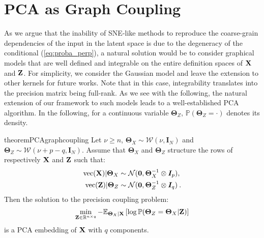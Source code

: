 \section{PCA as Graph Coupling}

As we argue that the inability of SNE-like methods to reproduce the coarse-grain dependencies of the input in the latent space is due to the degeneracy of the conditional (\ref{eq:proba_perp}), a natural solution would be to consider graphical models that are well defined and integrable on the entire definition spaces of $\mathbf{X}$ and $\mathbf{Z}$. For simplicity, we consider the Gaussian model and leave the extension to other kernels for future works. Note that in this case, integrability translates into the precision matrix being full-rank. As we see with the following, the natural extension of our framework to such models leads to a well-established PCA algorithm. In the following, for a continuous variable $\bm{\Theta}_{Z}$, $\mathbb{P}(\bm{\Theta}_{Z} = \cdot)$ denotes its density.


\begin{restatable}{theorem}{PCAgraphcoupling}
\label{PCA_graph_coupling}
Let $\nu \geq n$,  $\bm{\Theta}_{X} \sim \mathcal{W}(\nu, \bm{I}_N)$ and $\bm{\Theta}_{Z} \sim \mathcal{W}(\nu + p - q, \bm{I}_N)$. Assume that $\bm{\Theta}_{X}$ and $\bm{\Theta}_{Z}$ structure the rows of respectively $\mathbf{X}$ and $\mathbf{Z}$ such that: 
\begin{align}
    \mathrm{vec}(\mathbf{X}) | \bm{\Theta}_{X} &\sim \mathcal{N}(\bm{0}, \bm{\Theta}_{X}^{-1} \otimes \bm{I}_p), \label{eq:X_given_theta} \\
    \mathrm{vec}(\mathbf{Z}) | \bm{\Theta}_{Z} &\sim \mathcal{N}(\bm{0}, \bm{\Theta}_{Z}^{-1} \otimes \bm{I}_q) \label{eq:Z_given_theta} \:.
\end{align}
Then the solution to the precision coupling problem:
\begin{align*}
    \min_{\mathbf{Z} \in \mathbb{R}^{n \times q}} -\mathbb{E}_{\bm{\Theta}_{X} | \mathbf{X}}\left[\log \mathbb{P}(\bm{\Theta}_{Z}=\bm{\Theta}_{X}|\mathbf{Z})\right]
\end{align*}
is a PCA embedding of $\mathbf{X}$ with $q$ components.
\end{restatable}

